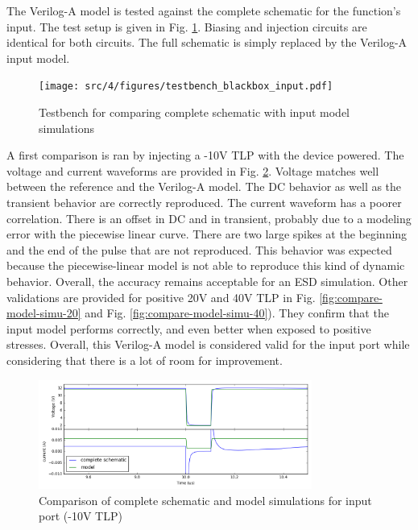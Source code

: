 The Verilog-A model is tested against the complete schematic for the function's input.
The test setup is given in Fig. \ref{fig:compare-veriloga-model-input}.
Biasing and injection circuits are identical for both circuits.
The full schematic is simply replaced by the Verilog-A input model.

\begin{figure}[!h]
  \centering
  \texttt{[image: src/4/figures/testbench\_blackbox\_input.pdf]}
  \caption{Testbench for comparing complete schematic with input model simulations}
  \label{fig:compare-veriloga-model-input}
\end{figure}

A first comparison is ran by injecting a -10V TLP with the device powered.
The voltage and current waveforms are provided in Fig. \ref{fig:compare-model-simu-m10}.
Voltage matches well between the reference and the Verilog-A model.
The DC behavior as well as the transient behavior are correctly reproduced.
The current waveform has a poorer correlation.
There is an offset in DC and in transient, probably due to a modeling error with the piecewise linear curve.
There are two large spikes at the beginning and the end of the pulse that are not reproduced.
This behavior was expected because the piecewise-linear model is not able to reproduce this kind of dynamic behavior.
Overall, the accuracy remains acceptable for an ESD simulation.
Other validations are provided for positive 20V and 40V TLP in Fig. \ref{fig:compare-model-simu-20} and Fig. \ref{fig:compare-model-simu-40}).
They confirm that the input model performs correctly, and even better when exposed to positive stresses.
Overall, this Verilog-A model is considered valid for the input port while considering that there is a lot of room for improvement.

\begin{figure}[!p]
  \centering
  \includegraphics[width=0.8\textwidth]{src/4/figures/comparison_model_total_m10V.png}
  \caption{Comparison of complete schematic and model simulations for input port (-10V TLP)}
  \label{fig:compare-model-simu-m10}
\end{figure}

